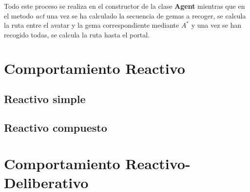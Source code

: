 Todo este proceso se realiza en el constructor de la clase \textbf{Agent} mientras que en el metodo \emph{act} una vez se ha calculado la secuencia de gemas a recoger, se calcula la ruta entre el avatar y la gema correspondiente mediante $ A^{*} $ y una vez se han recogido todas, se calcula la ruta hasta el portal.


\newpage
\chapter{Comportamiento Reactivo}
\section{Reactivo simple}
\section{Reactivo compuesto}

\newpage
\chapter{Comportamiento Reactivo-Deliberativo}
